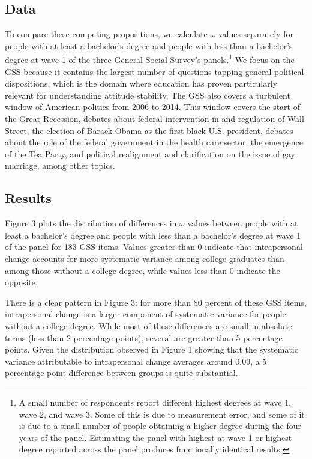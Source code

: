 \documentclass[
  11pt,
]{article}
\begin{document}
\subsection{Data}\label{data}

To compare these competing propositions, we calculate \(\omega\) values
separately for people with at least a bachelor's degree and people with
less than a bachelor's degree at wave 1 of the three General Social
Survey's panels.\footnote{A small number of respondents report different
  highest degrees at wave 1, wave 2, and wave 3. Some of this is due to
  measurement error, and some of it is due to a small number of people
  obtaining a higher degree during the four years of the panel.
  Estimating the panel with highest at wave 1 or highest degree reported
  across the panel produces functionally identical results.} We focus on
the GSS because it contains the largest number of questions tapping
general political dispositions, which is the domain where education has
proven particularly relevant for understanding attitude stability. The
GSS also covers a turbulent window of American politics from 2006 to
2014. This window covers the start of the Great Recession, debates about
federal intervention in and regulation of Wall Street, the election of
Barack Obama as the first black U.S. president, debates about the role
of the federal government in the health care sector, the emergence of
the Tea Party, and political realignment and clarification on the issue
of gay marriage, among other topics.

\subsection{Results}\label{results-1}

Figure 3 plots the distribution of differences in \(\omega\) values
between people with at least a bachelor's degree and people with less
than a bachelor's degree at wave 1 of the panel for 183 GSS items.
Values greater than 0 indicate that intrapersonal change accounts for
more systematic variance among college graduates than among those
without a college degree, while values less than 0 indicate the
opposite.

There is a clear pattern in Figure 3: for more than 80 percent of these
GSS items, intrapersonal change is a larger component of systematic
variance for people without a college degree. While most of these
differences are small in absolute terms (less than 2 percentage points),
several are greater than 5 percentage points. Given the distribution
observed in Figure 1 showing that the systematic variance attributable
to intrapersonal change averages around 0.09, a 5 percentage point
difference between groups is quite substantial.
\end{document}
